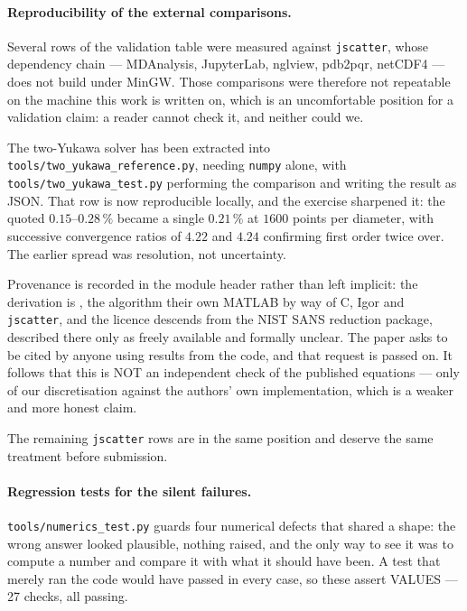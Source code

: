 \documentclass[11pt,a4paper]{article}
\newcommand{\code}[1]{\texttt{\hspace{0pt}#1}}
\begin{document}
\paragraph{Reproducibility of the external comparisons.} Several rows of the
validation table were measured against \code{jscatter}, whose dependency
chain --- MDAnalysis, JupyterLab, nglview, pdb2pqr, netCDF4 --- does not
build under MinGW. Those comparisons were therefore not repeatable on the
machine this work is written on, which is an uncomfortable position for a
validation claim: a reader cannot check it, and neither could we.

The two-Yukawa solver has been extracted into
\code{tools/two\_yukawa\_reference.py}, needing \code{numpy} alone, with
\code{tools/two\_yukawa\_test.py} performing the comparison and writing the
result as JSON. That row is now reproducible locally, and the exercise
sharpened it: the quoted $0.15$--$0.28\,\%$ became a single $0.21\,\%$ at
$1600$ points per diameter, with successive convergence ratios of $4.22$ and
$4.24$ confirming first order twice over. The earlier spread was resolution,
not uncertainty.

Provenance is recorded in the module header rather than left implicit: the
derivation is \citet{Liu2005}, the algorithm their own MATLAB by way of C,
Igor and \code{jscatter}, and the licence descends from the NIST SANS
reduction package, described there only as freely available and formally
unclear. The paper asks to be cited by anyone using results from the code,
and that request is passed on. It follows that this is NOT an independent
check of the published equations --- only of our discretisation against the
authors' own implementation, which is a weaker and more honest claim.

The remaining \code{jscatter} rows are in the same position and deserve the
same treatment before submission.

\paragraph{Regression tests for the silent failures.}
\code{tools/numerics\_test.py} guards four numerical defects that shared a
shape: the wrong answer looked plausible, nothing raised, and the only way to
see it was to compute a number and compare it with what it should have been.
A test that merely ran the code would have passed in every case, so these
assert VALUES --- 27 checks, all passing.
\end{document}
